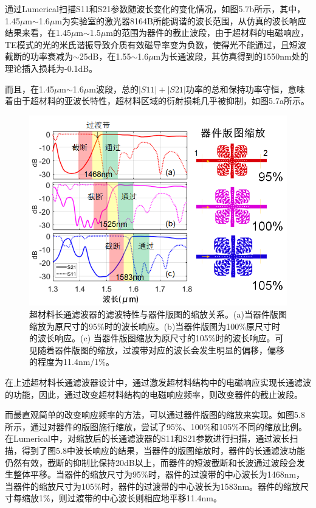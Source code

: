 通过Lumerical扫描S11和S21参数随波长变化的变化情况，如图5.7b所示，其中，1.45$\mu$m$\sim$1.6$\mu$m为实验室的激光器8164B所能调谐的波长范围，从仿真的波长响应结果来看，在1.45$\mu$m$\sim$1.5$\mu$m的范围为器件的截止波段，由于超材料的电磁响应，TE模式的光的米氏谐振导致介质有效磁导率变为负数，使得光不能通过，且短波截断的功率衰减为$\sim$25dB，在1.55$\sim$1.6$\mu$m为长通波段，其仿真得到的1550nm处的理论插入损耗为-0.1dB。

而且，在1.45$\mu$m$\sim$1.6$\mu$m波段，总的$|S11|+|S21|$功率的总和保持功率守恒，意味着由于超材料的亚波长特性，超材料区域的衍射损耗几乎被抑制，如图5.7a所示。

\begin{figure}[!htbp]
    \centering
    \includegraphics[width=1\textwidth]{Img/5-8.png}
    \caption{超材料长通滤波器的滤波特性与器件版图的缩放关系。(a)当器件版图缩放为原尺寸的95\%时的波长响应。(b)当器件版图为100\%原尺寸时的波长响应。(c) 当器件版图缩放为原尺寸的105\%时的波长响应。可见随着器件版图的缩放，过渡带对应的波长会发生明显的偏移，偏移的程度为11.4nm/1\%。}
    \label{fig:5-8}
\end{figure}

在上述超材料长通滤波器设计中，通过激发超材料结构中的电磁响应实现长通滤波的功能，因此，通过改变超材料结构的电磁响应频率，则改变器件的截止波段。

而最直观简单的改变响应频率的方法，可以通过器件版图的缩放来实现。如图5.8所示，通过对器件的版图施行缩放，尝试了95\%、100\%和105\%不同的缩放比例。在Lumerical中，对缩放后的长通滤波器的S11和S21参数进行扫描，通过波长扫描，得到了图5.8中波长响应的结果，当器件的版图缩放时，器件的长通滤波功能仍然有效，截断的抑制比保持20dB以上，而器件的短波截断和长波通过波段会发生整体平移。当器件的缩放尺寸为95\%时，器件的过渡带的中心波长为1468nm，当器件的缩放尺寸为105\%时，器件的过渡带的中心波长为1583nm。器件的缩放尺寸每缩放1\%，则过渡带的中心波长则相应地平移11.4nm。

